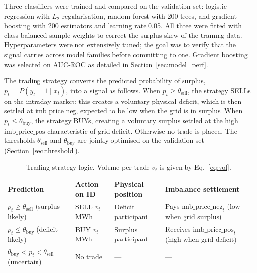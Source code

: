 \documentclass{article}
\begin{document}
Three classifiers were trained and compared on the validation set: logistic regression with $L_2$ regularisation, random forest with 200 trees, and gradient boosting with 200 estimators and learning rate 0.05. All three were fitted with class-balanced sample weights to correct the surplus-skew of the training data. Hyperparameters were not extensively tuned; the goal was to verify that the signal carries across model families before committing to one. Gradient boosting was selected on AUC-ROC as detailed in Section~\ref{sec:model_perf}.

The trading strategy converts the predicted probability of surplus, $p_t = P(y_t = 1 \mid x_t)$, into a signal as follows. When $p_t \geq \theta_{\text{sell}}$, the strategy SELLs on the intraday market: this creates a voluntary physical deficit, which is then settled at $\text{imb\_price\_neg}$, expected to be low when the grid is in surplus. When $p_t \leq \theta_{\text{buy}}$, the strategy BUYs, creating a voluntary surplus settled at the high $\text{imb\_price\_pos}$ characteristic of grid deficit. Otherwise no trade is placed. The thresholds $\theta_{\text{sell}}$ and $\theta_{\text{buy}}$ are jointly optimised on the validation set (Section~\ref{sec:threshold}).

\begin{table}[!htbp]                                        
\centering
\caption{Trading strategy logic. Volume per trade $v_t$ is given by Eq.~\eqref{eq:vol}.}
\label{tab:strategy}
\begin{tabular}{llll}
\toprule
\textbf{Prediction} & \textbf{Action on ID} & \textbf{Physical position} & \textbf{Imbalance settlement} \\
\midrule
$p_t \geq \theta_{\text{sell}}$ (surplus likely) & SELL $v_t$ MWh & Deficit participant & Pays $\text{imb\_price\_neg}_t$ (low when grid surplus) \\
$p_t \leq \theta_{\text{buy}}$ (deficit likely) & BUY $v_t$ MWh & Surplus participant & Receives $\text{imb\_price\_pos}_t$ (high when grid deficit) \\
$\theta_{\text{buy}} < p_t < \theta_{\text{sell}}$ (uncertain) & No trade & --- & --- \\
\bottomrule
\end{tabular}
\end{table} 
\end{document}
